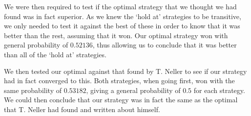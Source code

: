 \documentclass[a4paper,titlepage]{article}
\begin{document}
We were then required to test if the optimal strategy that we thought we had found was in fact superior. As we knew the ‘hold at’ strategies to be transitive, we only needed to test it against the best of these in order to know that it was better than the rest, assuming that it won. Our optimal strategy won with general probability of $0.52136$, thus allowing us to conclude that it was better than all of the ‘hold at’ strategies.

We then tested our optimal against that found by T. Neller\citep{neller2004optimal} to see if our strategy had in fact converged to this. Both strategies, when going first, won with the same probability of $0.53182$, giving a general probability of $0.5$ for each strategy. We could then conclude that our strategy was in fact the same as the optimal that T. Neller had found and written about himself.

\nocite{*}


\end{document}
